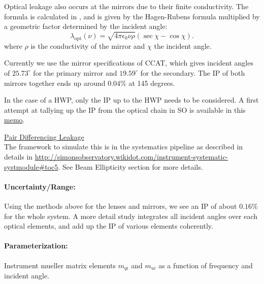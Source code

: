 Optical leakage also occurs at the mirrors due to their finite conductivity. 
The formula is calculated in \cite{Barkats:2005sh}, and is given by the Hagen-Rubens formula multiplied by 
a geometric factor determined by the incident angle:
\begin{equation}
\lambda_\text{opt}(\nu) = \sqrt{4 \pi \epsilon_0 \nu \rho} (\sec \chi - \cos \chi).
\end{equation}
where $\rho$ is the conductivity of the mirror and $\chi$ the incident angle.

Currently we use the mirror specifications of CCAT, which gives incident angles of $25.73^\circ$ for the primary mirror 
and $19.59^\circ$ for the secondary. The IP of both mirrors together ends up around $0.04\%$ at 145 degrees.

In the case of a HWP, only the IP up to the HWP needs to be considered.
A first attempt at tallying up the IP from the optical chain in SO is available in this \href{http://simonsobservatory.wdfiles.com/local--files/calandsys-telecon/eb_leakage_from_pointing_error.pdf?ukey=61f26ef33e8439a4e7096ab52c54c523066a4e35}{memo}.


\noindent \underline{Pair Differencing Leakage} \\
The framework to simulate this is in the systematics pipeline as described in details in \url{http://simonsobservatory.wikidot.com/instrument-systematic-systmodule#toc5}.
See Beam Ellipticity section for more details.

\paragraph{Uncertainty/Range:}
Using the methods above for the lenses and mirrors, we see an IP of about $0.16\%$ for the whole system.
A more detail study integrates all incident angles over each optical elements, and add up the IP of various elements  coherently.

\paragraph{Parameterization:}
Instrument mueller matrix elements $m_{qi}$ and $m_{ui}$ as a function of frequency and incident angle.


